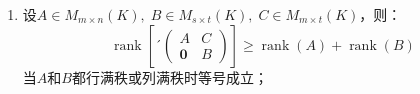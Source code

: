 \begin{property}
\begin{enumerate}
\begin{equation*}
\begin{pmatrix}
				A & \mathbf{0} \\
				\mathbf{0} & B
			\end{pmatrix}
			\right]=\operatorname{rank}(A)+\operatorname{rank}(B)
		\end{equation*}
		\item 设$A\in M_{m\times n}(K),\;B\in M_{s\times t}(K),\;C\in M_{m\times t}(K)$，则：
		\begin{equation*}
			\operatorname{rank}\left[
			´\begin{pmatrix}
				A & C\\
				\mathbf{0} & B
			\end{pmatrix}
			\right]\geqslant\operatorname{rank}(A)+\operatorname{rank}(B)
		\end{equation*}
		当$A$和$B$都行满秩或列满秩时等号成立；
	\end{enumerate}
\end{property}
